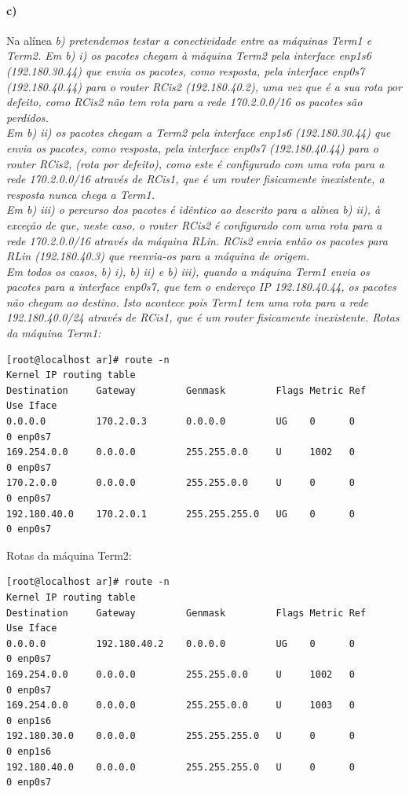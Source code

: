\paragraph{c)}
Na alínea \it{b)} pretendemos testar a conectividade entre as máquinas \textsf{Term1} e \textsf{Term2}.
Em \it{b) i)} os pacotes chegam à máquina \textsf{Term2} pela interface enp1s6 (192.180.30.44) que envia os pacotes, como resposta, pela interface enp0s7 (192.180.40.44) para o \emph{router} \textsf{RCis2} (192.180.40.2), uma vez que é a sua rota por defeito, como \textsf{RCis2} não tem rota para a rede 170.2.0.0/16 os pacotes são perdidos.\\
Em \it{b) ii)} os pacotes chegam a \textsf{Term2} pela interface enp1s6 (192.180.30.44) que envia os pacotes, como resposta, pela interface enp0s7 (192.180.40.44) para o \emph{router} \textsf{RCis2}, (rota por defeito), como este é configurado com uma rota para a rede 170.2.0.0/16 através de \textsf{RCis1}, que é um \emph{router} fisicamente inexistente, a resposta nunca chega a \textsf{Term1}.\\
Em \it{b) iii)} o percurso dos pacotes é idêntico ao descrito para a alínea \it{b) ii)}, à exceção de que, neste caso, o \emph{router} \textsf{RCis2} é configurado com uma rota para a rede 170.2.0.0/16 através da máquina \textsf{RLin}. \textsf{RCis2} envia então os pacotes para \textsf{RLin} (192.180.40.3) que reenvia-os para a máquina de origem.\\
Em todos os casos, \it{b) i)}, \it{b) ii)} e \it{b) iii)}, quando a máquina \textsf{Term1} envia os pacotes para a interface enp0s7, que tem o endereço IP 192.180.40.44, os pacotes não chegam ao destino. Isto acontece pois \textsf{Term1} tem uma rota para a rede 192.180.40.0/24 através de \textsf{RCis1}, que é um \emph{router} fisicamente inexistente.
\newpage
Rotas da máquina \textsf{Term1}:
\begin{verbatim}
[root@localhost ar]# route -n
Kernel IP routing table
Destination     Gateway         Genmask         Flags Metric Ref    Use Iface
0.0.0.0         170.2.0.3       0.0.0.0         UG    0      0        0 enp0s7
169.254.0.0     0.0.0.0         255.255.0.0     U     1002   0        0 enp0s7
170.2.0.0       0.0.0.0         255.255.0.0     U     0      0        0 enp0s7
192.180.40.0    170.2.0.1       255.255.255.0   UG    0      0        0 enp0s7
\end{verbatim}

Rotas da máquina \textsf{Term2}:
\begin{verbatim}
[root@localhost ar]# route -n
Kernel IP routing table
Destination     Gateway         Genmask         Flags Metric Ref    Use Iface
0.0.0.0         192.180.40.2    0.0.0.0         UG    0      0        0 enp0s7
169.254.0.0     0.0.0.0         255.255.0.0     U     1002   0        0 enp0s7
169.254.0.0     0.0.0.0         255.255.0.0     U     1003   0        0 enp1s6
192.180.30.0    0.0.0.0         255.255.255.0   U     0      0        0 enp1s6
192.180.40.0    0.0.0.0         255.255.255.0   U     0      0        0 enp0s7
\end{verbatim}

